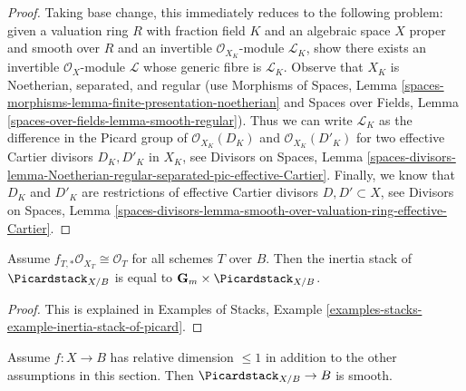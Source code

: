 \begin{proof}
Taking base change, this immediately reduces to the following
problem: given a valuation ring $R$ with fraction field $K$ and
an algebraic space $X$ proper and smooth over $R$ and an invertible
$\mathcal{O}_{X_K}$-module $\mathcal{L}_K$, show there exists
an invertible $\mathcal{O}_X$-module $\mathcal{L}$
whose generic fibre is $\mathcal{L}_K$.
Observe that $X_K$ is Noetherian, separated, and regular
(use Morphisms of Spaces, Lemma
\ref{spaces-morphisms-lemma-finite-presentation-noetherian}
and
Spaces over Fields, Lemma \ref{spaces-over-fields-lemma-smooth-regular}).
Thus we can write
$\mathcal{L}_K$ as the difference in the Picard group of
$\mathcal{O}_{X_K}(D_K)$ and $\mathcal{O}_{X_K}(D'_K)$
for two effective Cartier divisors $D_K, D'_K$ in $X_K$, see
Divisors on Spaces, Lemma
\ref{spaces-divisors-lemma-Noetherian-regular-separated-pic-effective-Cartier}.
Finally, we know that $D_K$ and $D'_K$ are restrictions of
effective Cartier divisors $D, D' \subset X$, see
Divisors on Spaces, Lemma
\ref{spaces-divisors-lemma-smooth-over-valuation-ring-effective-Cartier}.
\end{proof}

\begin{lemma}
\label{lemma-pic-inertia}
Assume $f_{T, *}\mathcal{O}_{X_T} \cong \mathcal{O}_T$ for all
schemes $T$ over $B$. Then the inertia stack of $\Picardstack_{X/B}$
is equal to $\mathbf{G}_m \times \Picardstack_{X/B}$.
\end{lemma}

\begin{proof}
This is explained in Examples of Stacks, Example
\ref{examples-stacks-example-inertia-stack-of-picard}.
\end{proof}

\begin{lemma}
\label{lemma-pic-curves-smooth}
Assume $f : X \to B$ has relative dimension $\leq 1$ in addition to
the other assumptions in this section. Then $\Picardstack_{X/B} \to B$
is smooth.
\end{lemma}

